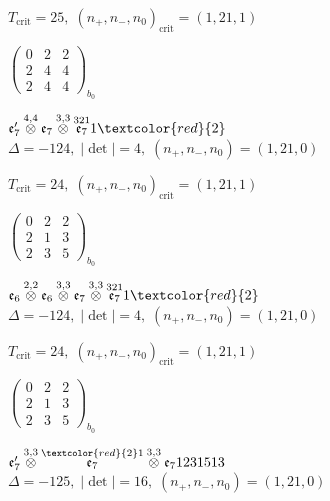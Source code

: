 \documentclass[10pt]{article}
\begin{document}
\hspace{1em}$T_{\text{crit}}=25,\; (n_+,n_-,n_0)_{\text{crit}}=(1,21,1)$

\hspace{2em}$\left(\begin{smallmatrix}0 & 2 & 2 \\ 2 & 4 & 4 \\ 2 & 4 & 4\end{smallmatrix}\right)_{\!b_0}$

\smallskip

$\mathfrak{e}_7'\overset{4,4}{\otimes}\mathfrak{e}_7\overset{3,3}{\otimes}\overset{321}{\mathfrak{e}_7}1\textcolor{red}{2}$ \quad $\Delta=-124,\; |\det|=4,\; (n_+,n_-,n_0)=(1,21,0)$

\hspace{1em}$T_{\text{crit}}=24,\; (n_+,n_-,n_0)_{\text{crit}}=(1,21,1)$

\hspace{2em}$\left(\begin{smallmatrix}0 & 2 & 2 \\ 2 & 1 & 3 \\ 2 & 3 & 5\end{smallmatrix}\right)_{\!b_0}$

\smallskip

$\mathfrak{e}_6\overset{2,2}{\otimes}\mathfrak{e}_6\overset{3,3}{\otimes}\mathfrak{e}_7\overset{3,3}{\otimes}\overset{321}{\mathfrak{e}_7}1\textcolor{red}{2}$ \quad $\Delta=-124,\; |\det|=4,\; (n_+,n_-,n_0)=(1,21,0)$

\hspace{1em}$T_{\text{crit}}=24,\; (n_+,n_-,n_0)_{\text{crit}}=(1,21,1)$

\hspace{2em}$\left(\begin{smallmatrix}0 & 2 & 2 \\ 2 & 1 & 3 \\ 2 & 3 & 5\end{smallmatrix}\right)_{\!b_0}$

\smallskip

$\mathfrak{e}_7'\overset{3,3}{\otimes}\overset{\textcolor{red}{2}1}{\mathfrak{e}_7}\overset{3,3}{\otimes}\mathfrak{e}_71231513$ \quad $\Delta=-125,\; |\det|=16,\; (n_+,n_-,n_0)=(1,21,0)$
\end{document}
